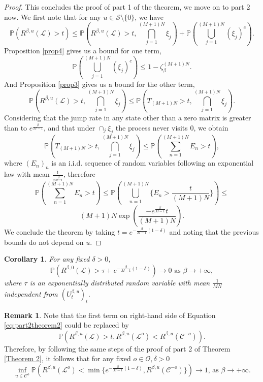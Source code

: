\documentclass[11pt]{article}
\newtheorem{corollary}[theorem]{Corollary}
\theoremstyle{definition}
\newtheorem{remark}{Remark}
\newcommand\ddfrac[2]{\frac{\displaystyle #1}{\displaystyle #2}}
\newcommand{\st}{\mathcal{S}}
\begin{document}
\begin{proof}
    This concludes the proof of part 1 of the theorem, we move on to part 2 now. We first note that for any $u\in\st\setminus\{0\}$, we have
    \begin{equation} \label{eq:part2theorem2}
        \mathbb{P}(R^{\beta,u}(\mathcal{L})>t)\leq \mathbb{P}\left(R^{\beta,u}(\mathcal{L})>t, \bigcap_{j=1}^{(M+1)N}\xi_j \right) + \mathbb{P}\left(\bigcup_{j=1}^{(M+1)N}(\xi_j)^c \right).
    \end{equation}
    Proposition \ref{prop4} gives us a bound for one term,
    $$
        \mathbb{P}\left(\bigcup_{j=1}^{(M+1)N}(\xi_j)^c \right) \leq 1-\zeta_\beta^{(M+1)N}.
    $$
    And Proposition \ref{prop3} gives us a bound for the other term,
    $$
        \mathbb{P}\left(R^{\beta,u}(\mathcal{L})>t, \bigcap_{j=1}^{(M+1)N}\xi_j \right) \leq \mathbb{P}\left(T_{(M+1)N}>t, \bigcap_{j=1}^{(M+1)N}\xi_j \right).
    $$
    Considering that the jump rate in any state other than a zero matrix is greater than to $e^{\frac{\beta}{M-1}}$, and that under $\cap_j\xi_j$ the process never visits $0$, we obtain
    $$
        \mathbb{P}\left(T_{(M+1)N}>t, \bigcap_{j=1}^{(M+1)N}\xi_j \right) \leq \mathbb{P}\left(\sum_{n=1}^{(M+1)N}E_n>t \right),
    $$
    where $(E_n)_n$ is an i.i.d. sequence of random variables following an exponential law with mean $\ddfrac{1}{e^{\frac{\beta}{M-1}}}$, therefore
    $$
        \mathbb{P}\left(\sum_{n=1}^{(M+1)N}E_n>t \right) \leq \mathbb{P}\left(\bigcup_{n=1}^{(M+1)N}\{E_n>\frac{t}{(M+1)N}\} \right)  \leq
    $$    
    $$   
        (M+1)N\exp\left(\frac{-e^{\frac{\beta}{M-1}}t}{(M+1)N}\right).
    $$
    We conclude the theorem by taking $t=e^{-\frac{\beta}{M-1}(1-\delta)}$ and noting that the previous bounds do not depend on $u$.
\end{proof}

\begin{corollary}\label{theo2coro2}
    For any fixed $\delta>0$, 
    $$
        \mathbb{P}(R^{\beta,0}(\mathcal{L})>\tau+e^{-\frac{\beta}{M-1}(1-\delta)})\rightarrow0\text{ as }\beta\rightarrow+\infty,
    $$
    where $\tau$ is an exponentially distributed random variable with mean $\frac{1}{MN}$ independent from $(U^{\beta,u}_t)_t$.
\end{corollary}

\begin{remark}\label{theo2rem1}
Note that the first term on right-hand side of Equation \eqref{eq:part2theorem2} could be replaced by
$$
\mathbb{P}(R^{\beta,u}(\mathcal{L})>t,R^{\beta, u}(\mathcal{L}^o)<R^{\beta,u}(\mathcal{C}^{-o})).
$$
Therefore, by following the same steps of the proof of part 2 of Theorem \ref{Theorem 2}, it follows that for any fixed $o\in\mathcal{O},\delta>0$
$$
\inf_{u\in\mathcal{C}^o}\mathbb{P}\left(R^{\beta, u}(\mathcal{L}^o)<\min\{e^{-\frac{\beta}{M-1}(1-\delta)},R^{\beta,u}(\mathcal{C}^{-o})\} \right)\rightarrow 1\text{, as }\beta\rightarrow +\infty.
$$
\end{remark}
\end{document}

